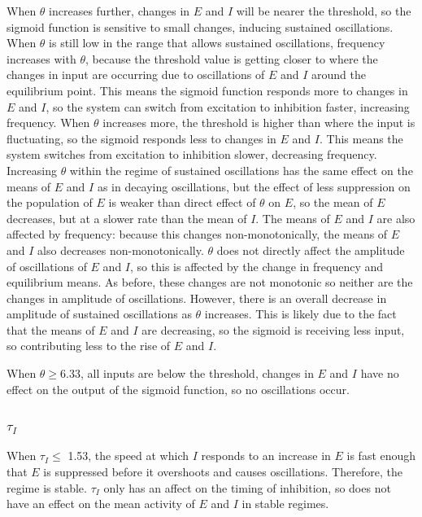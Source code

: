 \documentclass[10pt]{article}
\begin{document}
\begin{flushleft}
When $\theta$ increases further, changes in $E$ and $I$ will be nearer the threshold, so the sigmoid function is sensitive to small changes, inducing sustained oscillations. When $\theta$ is still low in the range that allows sustained oscillations, frequency increases with $\theta$, because the threshold value is getting closer to where the changes in input are occurring due to oscillations of $E$ and $I$ around the equilibrium point. This means the sigmoid function responds more to changes in $E$ and $I$, so the system can switch from excitation to inhibition faster, increasing frequency. When $\theta$ increases more, the threshold is higher than where the input is fluctuating, so the sigmoid responds less to changes in $E$ and $I$. This means the system switches from excitation to inhibition slower, decreasing frequency. Increasing $\theta$ within the regime of sustained oscillations has the same effect on the means of $E$ and $I$ as in decaying oscillations, but the effect of less suppression on the population of $E$ is weaker than direct effect of $\theta$ on $E$, so the mean of $E$ decreases, but at a slower rate than the mean of $I$. The means of $E$ and $I$ are also affected by frequency: because this changes non-monotonically, the means of $E$ and $I$ also decreases non-monotonically. $\theta$ does not directly affect the amplitude of oscillations of $E$ and $I$, so this is affected by the change in frequency and equilibrium means. As before, these changes are not monotonic so neither are the changes in amplitude of oscillations. However, there is an overall decrease in amplitude of sustained oscillations as $\theta$ increases. This is likely due to the fact that the means of $E$ and $I$ are decreasing, so the sigmoid is receiving less input, so contributing less to the rise of $E$ and $I$.
\newline

When $\theta \geq 6.33$, all inputs are below the threshold, changes in $E$ and $I$ have no effect on the output of the sigmoid function, so no oscillations occur. 

\subsubsection{$\tau_I$}

When $\tau_I \leq$ 1.53, the speed at which $I$ responds to an increase in $E$ is fast enough that $E$ is suppressed before it overshoots and causes oscillations. Therefore, the regime is stable. $\tau_I$ only has an affect on the timing of inhibition, so does not have an effect on the mean activity of $E$ and $I$ in stable regimes.
\newline


\end{flushleft}
\end{document}
